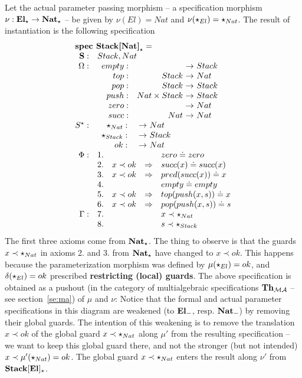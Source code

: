 Let the actual parameter passing morphism -- a specification morphism
$\nu:{\bf El}_\star\to{\bf Nat}_\star$ -- be given by $\nu(El)= Nat$
and $\nu(\star_{El}) = \star_{Nat}$. The result of instantiation is the following specification
\[
	\spec{
	\tit{\mbox{\bf spec\ Stack[Nat]}_\cons^{{}}=} \\
		\spSorts{\Sorts} {Stack,Nat}
		\spOps{\Ops} { empty: && Stack\\
			 top: & Stack & Nat\\
			 pop: & Stack & Stack\\
			 push: & Nat \times Stack & Stack \\
			 zero: && Nat \\
			 succ: & Nat & Nat }
		\spOps{{\allcons}}{	 \cons_{Nat}: &&  Nat \\
			 \cons_{Stack}: && Stack \\
			 ok: && Nat }
		\Phi:
			&1.& && zero \eleq zero \\
			&2.& x \prec ok & \To & succ(x) \eleq succ(x)\\
			&3.& x \prec ok & \To & pred(succ(x)) \eleq x\\
			&4.& && empty \eleq empty \\
			&5.& x \prec ok
				 & \To & top(push(x,s)) \eleq x\\
			&6.& x \prec ok
				& \To & pop(push(x,s)) \eleq s \\
		\Gamma:	&7.& && x \prec \cons_{Nat}\\
			&8.& && s \prec \cons_{Stack} \\
	}
\]
%
The first three axioms come from ${\bf Nat}_\star$.
The thing to observe is that the guards $x\prec \star_{Nat}$ in axioms 2. and 3. from ${\bf
Nat}_\star$ have changed to $x\prec ok$. This happens because the
parameterization morphism was defined by $\mu(\star_{El}) = ok$, and
$\delta(\star_{El})=ok$ prescribed {\bf restricting (local) guards}.
The
above specification is obtained as a pushout (in the category of
multialgebraic specifications ${\bf Th}_{{\mathcal{MA}}}$ -- see section~\ref{se:ma}) of $\mu$ and $\nu$:
Notice that the formal and actual parameter specifications in this diagram
are weakened (to ${\bf El}_-$, resp. ${\bf Nat}_{-}$) by removing
their global guards. The intention of this weakening is to remove the translation
$x\prec ok$ of the global guard $x\prec \star_{Nat}$ along $\mu'$ from the resulting
specification -- we want to keep this global guard there, and not the
stronger (but not intended) $x\prec \mu'(\star_{Nat})=ok$. The global guard
$x\prec\star_{Nat}$ enters the result along
$\nu'$ from ${\bf Stack[El]_\star}$.

